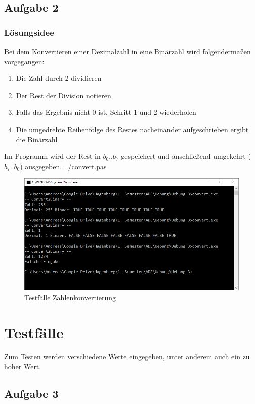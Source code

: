 \subsection*{Aufgabe 2}
\subsubsection*{Lösungsidee}
Bei dem Konvertieren einer Dezimalzahl in eine Binärzahl wird folgendermaßen vorgegangen:
\begin{enumerate}
\item Die Zahl durch 2 dividieren
\item Der Rest der Division notieren
\item Falls das Ergebnis nicht 0 ist, Schritt 1 und 2 wiederholen
\item Die umgedrehte Reihenfolge des Restes nacheinander aufgeschrieben ergibt die Binärzahl
\end{enumerate}
Im Programm wird der Rest in $b_{0} .. b_{7}$ gespeichert und anschließend umgekehrt ($b_{7} .. b_{0}$) ausgegeben.
\newline
 {../convert.pas}
\begin{figure}[H]
	\centering
	\includegraphics[scale=0.75]{./pictures/convert.png}
	\caption{Testfälle Zahlenkonvertierung}
	\label{fig: Sortieralgorithmus}
\end{figure}

\section*{Testfälle}
Zum Testen werden verschiedene Werte eingegeben, unter anderem auch ein zu hoher Wert.
\newpage

\subsection*{Aufgabe 3}
